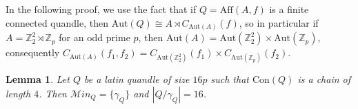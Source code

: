 \documentclass[a4paper, english, 9pt]{amsart}
\theoremstyle{plain}
\newtheorem{lemma}[theorem]{Lemma}
\theoremstyle{definition}
\def\aut#1{\mathrm{Aut}(#1)}
\def\aff#1{\mathrm{Aff}#1}
\def\dis{\mathrm{Dis}}
\def\con{\mathrm{Con}}
\def\lcm{\mathrm{lcm}}
\def\setof#1#2{\{#1\,\colon\,#2\}}
\def\Z{\mathbb Z}
\def\ma{\mathcal Min}
\begin{document}

In the following proof, we use the fact that if $Q=\aff(A,f)$ is a finite connected quandle, then $\aut{Q}\cong A\rtimes C_{\aut{A}}(f)$, so in particular if $A=\Z_2^2\rtimes \Z_p$ for an odd prime $p$, then $\aut{A}=\aut{\Z_2^2}\times \aut{\Z_p}$, consequently $C_{\aut{A}}(f_1,f_2)=C_{\aut{\Z_2^2}}(f_1)\times C_{\aut{\Z_p}}(f_2)$.




\begin{lemma}\label{lemma 4 chain}
Let $Q$ be a latin quandle of size $16p$ such that $\con(Q)$ is a chain of length $4$. Then $\ma_Q=\{ \gamma_Q\}$ and $|Q/\gamma_Q|=16$.


    
    

\end{lemma}
\end{document}
